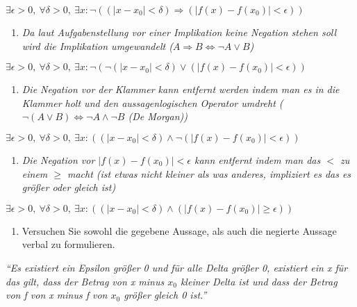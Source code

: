 \begin{center}
$\exists \epsilon > 0, \ \forall \delta > 0, \ \exists x : \lnot ((| x - x_0 | < \delta) \Rightarrow (| f(x) - f(x_0)| < \epsilon))$
\end{center}

\begin{enumerate}[label={3.}, leftmargin=*]
\item \textit{Da laut Aufgabenstellung vor einer Implikation keine Negation stehen soll wird die Implikation umgewandelt ($A \Rightarrow B \Leftrightarrow \lnot A \lor B$)}
\end{enumerate}

\begin{center}
$\exists \epsilon > 0, \ \forall \delta > 0, \ \exists x : \lnot (\lnot (|x - x_0| < \delta) \lor (|f(x) - f(x_0)| < \epsilon))$
\end{center}

\begin{enumerate}[label={4.}, leftmargin=*]
\item \textit{Die Negation vor der Klammer kann entfernt werden indem man es in die Klammer holt und den aussagenlogischen Operator umdreht ($\lnot(A \lor B) \Leftrightarrow \lnot A \land \lnot B$ (De Morgan))}
\end{enumerate}

\begin{center}
$\exists \epsilon > 0, \ \forall \delta > 0, \ \exists x : ((|x - x_0| < \delta) \land \lnot (|f(x) - f(x_0)| < \epsilon))$
\end{center}

\begin{enumerate}[label={5.}, leftmargin=*]
\item \textit{Die Negation vor $|f(x) - f(x_0)| < \epsilon$ kann entfernt indem man das $<$ zu einem $\geq$ macht (ist etwas nicht kleiner als was anderes, impliziert es das es größer oder gleich ist)}
\end{enumerate}

\begin{center}
$\exists \epsilon > 0, \ \forall \delta > 0, \ \exists x : ((|x - x_0| < \delta) \land (|f(x) - f(x_0)| \geq \epsilon))$
\end{center}

\begin{enumerate}[label={c)}, leftmargin=*]
\item Versuchen Sie sowohl die gegebene Aussage, als auch die negierte Aussage verbal zu formulieren.
\end{enumerate}

\textit{``Es existiert ein Epsilon größer 0 und für alle Delta größer 0, existiert ein x für das gilt, dass der Betrag von x minus $x_0$ kleiner Delta ist und dass der Betrag von f von x minus f von $x_0$ größer gleich 0 ist.''}